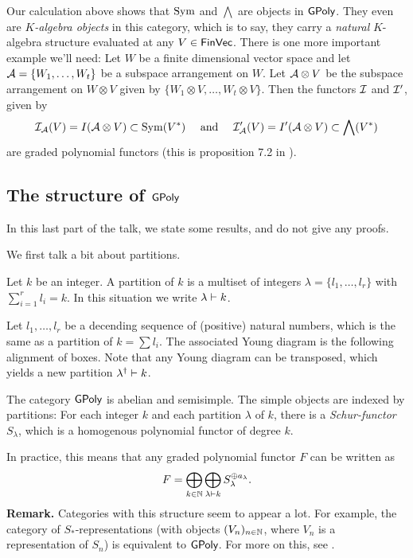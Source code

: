 \documentclass[../main.tex]{subfiles}
\begin{document}
Our calculation above shows that $\operatorname{Sym}$ and $\bigwedge$ are objects in $\textnormal{$\textsf{GPoly}$}$. 
They even are \emph{$K$-algebra objects} in this category, which is to say, they 
carry a \emph{natural} $K$-algebra structure evaluated at any $V \in \textnormal{$\textsf{FinVec}$}$.
There is one more important example we'll need: Let $W$ be a finite dimensional vector
space and let $\mathcal{A} = \{W_1,\dots, W_t\}$ be a subspace arrangement on $W$. Let
$\mathcal{A} \otimes V$ be the subspace arrangement on $W \otimes V$ given by 
$\{W_1 \otimes V, \dots, W_t \otimes V\}$. Then the functors $\mathcal{I}$ and $\mathcal{I}'$, given by
\begin{equation*}
    \mathcal{I}_{\mathcal{A}}(V) = I(\mathcal{A} \otimes V) \subset \operatorname{Sym}(V^*) \quad \text{ and } \quad
    \mathcal{I}'_{\mathcal{A}}(V) = I'(\mathcal{A} \otimes V) \subset \bigwedge(V^*)
\end{equation*}
are graded polynomial functors (this is proposition 7.2 in 
\cite{gandini2021degree}). 

\subsection{The structure of $\textnormal{$\textsf{GPoly}$}$}
In this last part of the talk, we state some results, and do not give any proofs.

We first talk a bit about partitions.
\begin{defi}[Partition]
    Let $k$ be an integer. A partition of $k$ is a multiset of integers
    $\lambda = \{l_1, \dots, l_r\}$ with $\sum_{i = 1}^r l_i = k$. In this 
    situation we write $\lambda \vdash k$.
\end{defi}
\begin{defi}
    Let $l_1, \dots, l_r$ be a decending sequence of (positive) natural numbers,
    which is the same as a partition of $k = \sum l_i$. The associated Young diagram
    is the following alignment of boxes.
    Note that any Young diagram can be transposed, which yields a new partition
    $\lambda^\dagger \vdash k$.
\end{defi}


\begin{thm}
    The category $\textnormal{$\textsf{GPoly}$}$ is abelian and semisimple. The simple objects are indexed
    by partitions: For each integer $k$ and each partition $\lambda$ of $k$, there 
    is a \emph{Schur-functor} $S_\lambda$, which is a homogenous polynomial functor
    of degree $k$.
\end{thm}
In practice, this means that any graded polynomial functor $F$ can be written as
\begin{equation*}
    F = \bigoplus_{k \in \mathbb{N}} \bigoplus_{\lambda \vdash k} S_\lambda^{\oplus a_\lambda}.
\end{equation*}
\textbf{Remark.} Categories with this structure seem to appear a lot. For
example, the category of $S_*$-representations (with objects $(V_n)_{n \in \mathbb{N}}$, where
$V_n$ is a representation of $S_n$) is equivalent to $\textnormal{$\textsf{GPoly}$}$. For more on this,
see \cite{sam2012introduction}.
\end{document}
